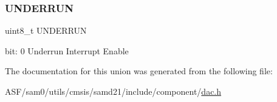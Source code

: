 \subsubsection{\texorpdfstring{UNDERRUN}{UNDERRUN}}
{\footnotesize\ttfamily uint8\+\_\+t U\+N\+D\+E\+R\+R\+UN}

bit\+: 0 Underrun Interrupt Enable 

The documentation for this union was generated from the following file\+:\begin{DoxyCompactItemize}
\item 
A\+S\+F/sam0/utils/cmsis/samd21/include/component/\mbox{\hyperlink{component_2dac_8h}{dac.\+h}}\end{DoxyCompactItemize}
